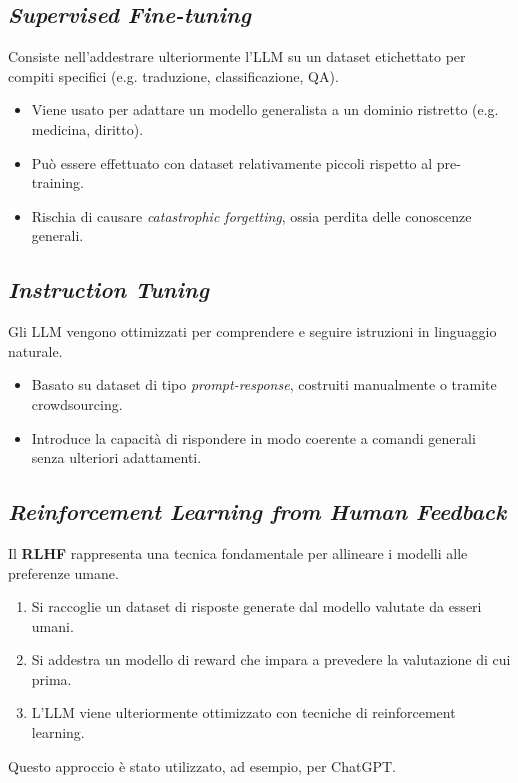 \subsection{\textit{Supervised Fine-tuning}}
Consiste nell'addestrare ulteriormente l'LLM su un dataset etichettato per compiti specifici (e.g. traduzione, classificazione, QA).
\begin{itemize}
    \item Viene usato per adattare un modello generalista a un dominio ristretto (e.g. medicina, diritto).
    \item Può essere effettuato con dataset relativamente piccoli rispetto al pre-training.
    \item Rischia di causare \textit{catastrophic forgetting}, ossia perdita delle conoscenze generali.
\end{itemize}

\subsection{\textit{Instruction Tuning}}
Gli LLM vengono ottimizzati per comprendere e seguire istruzioni in linguaggio naturale.
\begin{itemize}
    \item Basato su dataset di tipo \textit{prompt-response}, costruiti manualmente o tramite crowdsourcing.
    \item Introduce la capacità di rispondere in modo coerente a comandi generali senza ulteriori adattamenti.
\end{itemize}
\cite{chung2022scaling}

\subsection{\textit{Reinforcement Learning from Human Feedback}}
Il \textbf{RLHF} \cite{ziegler2019fine} rappresenta una tecnica fondamentale per allineare i modelli alle preferenze umane.
\begin{enumerate}
    \item Si raccoglie un dataset di risposte generate dal modello valutate da esseri umani.
    \item Si addestra un modello di reward che impara a prevedere la valutazione di cui prima.
    \item L'LLM viene ulteriormente ottimizzato con tecniche di reinforcement learning.
\end{enumerate}
Questo approccio è stato utilizzato, ad esempio, per ChatGPT.

